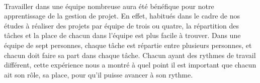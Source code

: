 \paragraph{}
Travailler dans une équipe nombreuse aura été bénéfique pour notre apprentissage de la gestion de projet. En effet, habitués dans le cadre de nos études à réaliser des projets par équipe de trois ou quatre, la répartition des tâches et la place de chacun dans l'équipe est plus facile à trouver. Dans une équipe de sept personnes, chaque tâche est répartie entre plusieurs personnes, et chacun doit faire sa part dans chaque tâche. Chacun ayant des rythmes de travail différent, cette expérience nous a montré à quel point il est important que chacun ait son rôle, sa place, pour qu'il puisse avancer à son rythme.
